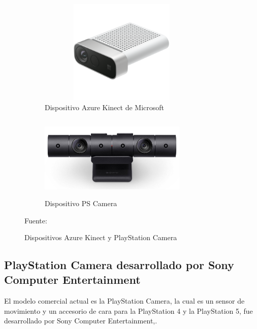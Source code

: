 \begin{figure}
	\centering
	\begin{subfigure}{.5\textwidth}
		\centering
		\includegraphics[width=8cm,height=5cm,]{./Images/azurekinect.png}
		\caption{Dispositivo Azure Kinect de Microsoft}
		\label{azureexample}
	\end{subfigure}%
	\begin{subfigure}{0.5\textwidth}
		\centering
		\includegraphics[width=7cm,height=4cm,]{./Images/cameraex.jpg}
		\caption{Dispositivo PS Camera}
		\label{cameraex}
	\end{subfigure}
	\caption{Dispositivos Azure Kinect y PlayStation Camera}
	\footnotesize Fuente: \cite{cameraex} \cite{azurekinect}
	\label{AzureandCameraExample}
\end{figure}




\subsection{PlayStation Camera desarrollado por Sony Computer Entertainment}

El modelo comercial actual es la PlayStation Camera, la cual es un sensor de movimiento y un accesorio de cara para la PlayStation 4 y la PlayStation 5, fue desarrollado por Sony Computer Entertainment,.

